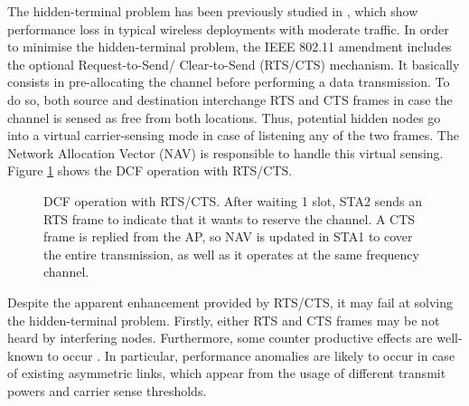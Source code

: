 \documentclass[12pt, a4paper,twoside]{tesi_upf}
\begin{document}
			The hidden-terminal problem has been previously studied in \cite{ekici2008ieee, jang2012ieee}, which show performance loss in typical wireless deployments with moderate traffic. In order to minimise the hidden-terminal problem, the IEEE 802.11 amendment includes the optional Request-to-Send/ Clear-to-Send (RTS/CTS) mechanism. It basically consists in pre-allocating the channel before performing a data transmission. To do so, both source and destination interchange RTS and CTS frames in case the channel is sensed as free from both locations. Thus, potential hidden nodes go into a virtual carrier-sensing mode in case of listening any of the two frames. The Network Allocation Vector (NAV) is responsible to handle this virtual sensing. Figure \ref{fig:dcf_operation} shows the DCF operation with RTS/CTS.					
			\begin{figure}[h!]
				\centering
				\caption{DCF operation with RTS/CTS. After waiting 1 slot, STA2 sends an RTS frame to indicate that it wants to reserve the channel. A CTS frame is replied from the AP, so NAV is updated in STA1 to cover the entire transmission, as well as it operates at the same frequency channel.}
				\label{fig:dcf_operation}
			\end{figure}
			Despite the apparent enhancement provided by RTS/CTS, it may fail at solving the hidden-terminal problem. Firstly, either RTS and CTS frames may be not heard by interfering nodes. Furthermore, some counter productive effects are well-known to occur \cite{sobrinho2005rts}. In particular, performance anomalies are likely to occur in case of existing asymmetric links, which appear from the usage of different transmit powers and carrier sense thresholds.
					
\end{document}
